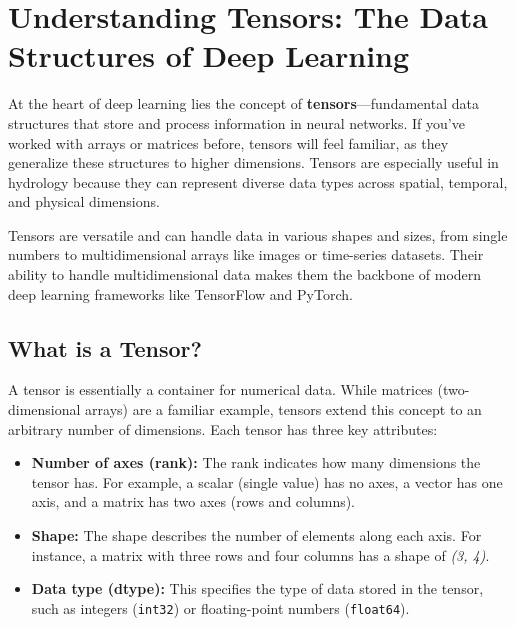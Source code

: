 \section{Understanding Tensors: The Data Structures of Deep Learning}

At the heart of deep learning lies the concept of \textbf{tensors}—fundamental data structures that store and process information in neural networks. If you’ve worked with arrays or matrices before, tensors will feel familiar, as they generalize these structures to higher dimensions. Tensors are especially useful in hydrology because they can represent diverse data types across spatial, temporal, and physical dimensions.

Tensors are versatile and can handle data in various shapes and sizes, from single numbers to multidimensional arrays like images or time-series datasets. Their ability to handle multidimensional data makes them the backbone of modern deep learning frameworks like TensorFlow and PyTorch.

\subsection{What is a Tensor?}

A tensor is essentially a container for numerical data. While matrices (two-dimensional arrays) are a familiar example, tensors extend this concept to an arbitrary number of dimensions. Each tensor has three key attributes:

\begin{itemize}
    \item \textbf{Number of axes (rank):} The rank indicates how many dimensions the tensor has. For example, a scalar (single value) has no axes, a vector has one axis, and a matrix has two axes (rows and columns).
    \item \textbf{Shape:} The shape describes the number of elements along each axis. For instance, a matrix with three rows and four columns has a shape of \textit{(3, 4)}.
    \item \textbf{Data type (dtype):} This specifies the type of data stored in the tensor, such as integers (\texttt{int32}) or floating-point numbers (\texttt{float64}).
\end{itemize}

